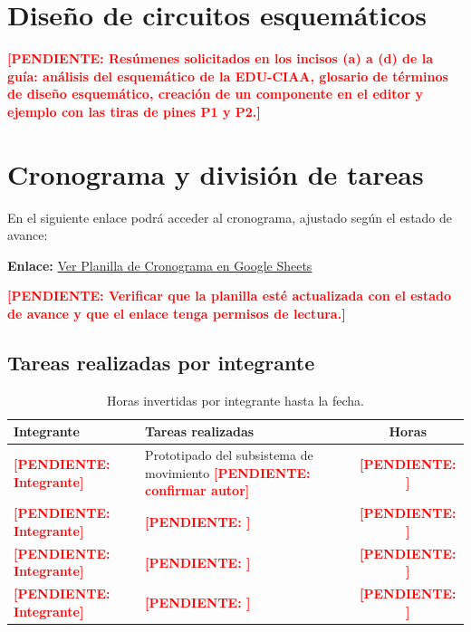 \documentclass[12pt,a4paper]{article}
\newcommand{\pendiente}[1]{\textcolor{red}{\textbf{[PENDIENTE: #1]}}}
\begin{document}
\newpage

\section{Diseño de circuitos esquemáticos}
\pendiente{Resúmenes solicitados en los incisos (a) a (d) de la guía: análisis del esquemático de la EDU-CIAA, glosario de términos de diseño esquemático, creación de un componente en el editor y ejemplo con las tiras de pines P1 y P2.}

\section{Cronograma y división de tareas}

\begin{tcolorbox}[colframe=green!60!black, colback=green!5!white, arc=2mm, title=\textbf{Cronograma ajustado (Google Sheets)}]
  En el siguiente enlace podrá acceder al cronograma, ajustado según el estado de avance:
  \vspace{0.2cm}

  \textbf{Enlace:} \href{https://docs.google.com/spreadsheets/d/1GAEeQZzlFaMgwrWLOeSPeK0nOuYQg2peXEuDazYDfk4/edit?usp=sharing}{Ver Planilla de Cronograma en Google Sheets}
\end{tcolorbox}

\pendiente{Verificar que la planilla esté actualizada con el estado de avance y que el enlace tenga permisos de lectura.}

\subsection{Tareas realizadas por integrante}
\begin{table}[H]
\centering
\caption{Horas invertidas por integrante hasta la fecha.}
\begin{tabular}{L{4cm}L{6.5cm}c}
\toprule
Integrante & Tareas realizadas & Horas \\
\midrule
\pendiente{Integrante} & Prototipado del subsistema de movimiento \pendiente{confirmar autor} & \pendiente{} \\
\pendiente{Integrante} & \pendiente{} & \pendiente{} \\
\pendiente{Integrante} & \pendiente{} & \pendiente{} \\
\pendiente{Integrante} & \pendiente{} & \pendiente{} \\
\bottomrule
\end{tabular}
\end{table}
\end{document}
